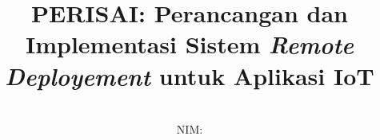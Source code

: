 \documentclass[bahasa, 12pt, a4paper, onecolumn, oneside, final]{report}
\begin{document}
\title{PERISAI: Perancangan dan Implementasi Sistem \textit{Remote Deployement} untuk Aplikasi IoT}
\date{}
\author{
  \authorname \\
  NIM: \authornim
}




% 

\pagestyle{plain}



% 







% 
% 
% 
% 
% 




% 
\end{document}
